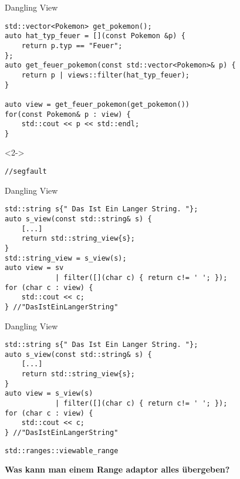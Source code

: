 \begin{frame}[fragile]{Dangling View}
    \begin{overlayarea}{\linewidth}{6cm}
        \begin{verbatim}
std::vector<Pokemon> get_pokemon();
auto hat_typ_feuer = [](const Pokemon &p) {
    return p.typ == "Feuer";
};
auto get_feuer_pokemon(const std::vector<Pokemon>& p) {
    return p | views::filter(hat_typ_feuer);
}
    
auto view = get_feuer_pokemon(get_pokemon())
for(const Pokemon& p : view) {
    std::cout << p << std::endl;
}
        \end{verbatim}
        \begin{onlyenv}<2->
            \begin{verbatim}
//segfault
            \end{verbatim}
        \end{onlyenv}
    \end{overlayarea}
\end{frame}


\begin{frame}[fragile]{Dangling View}
    \begin{verbatim}
std::string s{" Das Ist Ein Langer String. "};
auto s_view(const std::string& s) {
    [...]
    return std::string_view{s};
}
std::string_view = s_view(s);
auto view = sv
            | filter([](char c) { return c!= ' '; });
for (char c : view) {
    std::cout << c;
} //"DasIstEinLangerString"
    \end{verbatim}
\end{frame}

\begin{frame}[fragile]{Dangling View}
    \begin{verbatim}
std::string s{" Das Ist Ein Langer String. "};
auto s_view(const std::string& s) {
    [...]
    return std::string_view{s};
}
auto view = s_view(s)
            | filter([](char c) { return c!= ' '; });
for (char c : view) {
    std::cout << c;
} //"DasIstEinLangerString"
    \end{verbatim}
\end{frame}

\begin{frame}{\texttt{std::ranges::viewable_range}}
    \begin{center}
        \textbf{Was kann man einem Range adaptor alles übergeben?}
    \end{center}
\end{frame}

